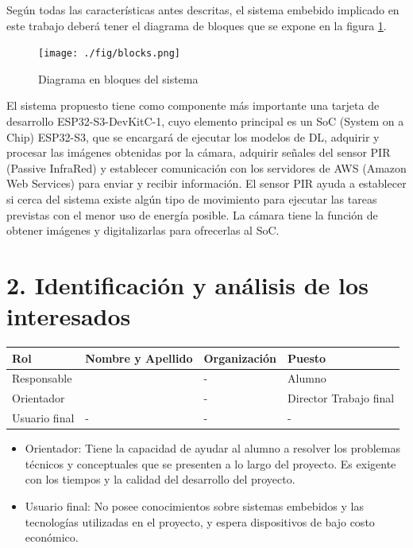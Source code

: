 \documentclass[
11pt, %
]{plan}
\begin{document}
Según todas las características antes descritas, el sistema embebido implicado en este trabajo deberá tener el diagrama de bloques que se expone en la figura \ref{fig:blocks}.

\begin{figure}[htpb]
\centering
\texttt{[image: ./fig/blocks.png]}
\caption{Diagrama en bloques del sistema}
\label{fig:blocks}
\end{figure}

\vspace{25px}

El sistema propuesto tiene como componente más importante una tarjeta de desarrollo ESP32-S3-DevKitC-1, cuyo elemento principal es un SoC (System on a Chip) ESP32-S3, que se encargará de ejecutar los modelos de DL, adquirir y procesar las imágenes obtenidas por la cámara, adquirir señales del sensor PIR (Passive InfraRed) y establecer comunicación con los servidores de AWS (Amazon Web Services) para enviar y recibir información. El sensor PIR ayuda a establecer si cerca del sistema existe algún tipo de movimiento para ejecutar las tareas previstas con el menor uso de energía posible. La cámara tiene la función de obtener imágenes y digitalizarlas para ofrecerlas al SoC.

\section{2. Identificación y análisis de los interesados}
\label{sec:interesados}

\begin{table}[ht]
\begin{tabularx}{\linewidth}{@{}|l|X|X|l|@{}}
\hline
\rowcolor[HTML]{C0C0C0}
Rol           & Nombre y Apellido & Organización 			& Puesto 	\\ \hline
Responsable   & \authorname		& -        				& Alumno 	\\ \hline
Orientador    & \supname			& - 						& Director Trabajo final \\ \hline
Usuario final & -                 & -             			& -       	\\ \hline
\end{tabularx}
\end{table}

\begin{itemize}
	\item Orientador: Tiene la capacidad de ayudar al alumno a resolver los problemas técnicos y conceptuales que se presenten a lo largo del proyecto. Es exigente con los tiempos y la calidad del desarrollo del proyecto.
	\item Usuario final: No posee conocimientos sobre sistemas embebidos y las tecnologías utilizadas en el proyecto, y espera dispositivos de bajo costo económico.
\end{itemize}
\end{document}
